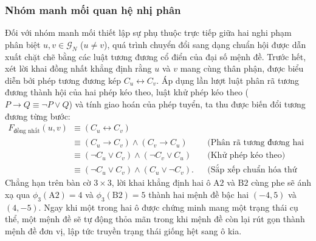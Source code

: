 \subsubsection{Nhóm manh mối quan hệ nhị phân}
Đối với nhóm manh mối thiết lập sự phụ thuộc trực tiếp giữa hai nghi phạm phân
biệt $u, v \in \mathcal{G}_N$ ($u \ne v$), quá trình chuyển đổi sang dạng chuẩn
hội được dẫn xuất chặt chẽ bằng các luật tương đương cổ điển của đại số mệnh đề.
Trước hết, xét lời khai đồng nhất khẳng định rằng $u$ và $v$ mang cùng thân phận,
được biểu diễn bởi phép tương đương kép $C_u \leftrightarrow C_v$. Áp dụng lần
lượt luật phân rã tương đương thành hội của hai phép kéo theo, luật khử phép kéo
theo ($P \to Q \equiv \neg P \vee Q$) và tính giao hoán của phép tuyển, ta thu
được biến đổi tương đương từng bước:
\begin{align}
    F_{\text{đồng nhất}}(u, v) &\equiv (C_u \leftrightarrow C_v) \nonumber\\
    &\equiv (C_u \to C_v) \wedge (C_v \to C_u)
        && \text{(Phân rã tương đương hai chiều)} \nonumber\\
    &\equiv (\neg C_u \vee C_v) \wedge (\neg C_v \vee C_u)
        && \text{(Khử phép kéo theo)} \nonumber\\
    &\equiv (\neg C_u \vee C_v) \wedge (C_u \vee \neg C_v).
        && \text{(Sắp xếp chuẩn hóa thứ tự biến)}
    \label{eq:cnf_same}
\end{align}
Chẳng hạn trên bàn cờ $3 \times 3$, lời khai khẳng định hai ô $\text{A2}$ và
$\text{B2}$ cùng phe sẽ ánh xạ qua $\phi_3(\text{A2}) = 4$ và
$\phi_3(\text{B2}) = 5$ thành hai mệnh đề bậc hai $(-4, 5)$ và $(4, -5)$. Ngay khi
một trong hai ô được chứng minh mang một trạng thái cụ thể, một mệnh đề sẽ tự động
thỏa mãn trong khi mệnh đề còn lại rút gọn thành mệnh đề đơn vị, lập tức truyền
trạng thái giống hệt sang ô kia.

